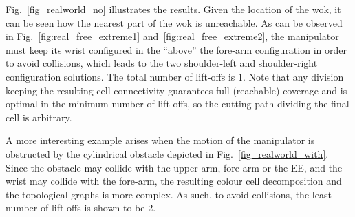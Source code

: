 \documentclass[journal]{IEEEtran}
\begin{document}
Fig.~\ref{fig_realworld_no} illustrates the results. Given the location of the wok, it can be seen how the nearest %
part of the wok is unreachable. 
As can be observed in Fig.~\ref{fig:real_free_extreme1} and~\ref{fig:real_free_extreme2}, 
the manipulator must keep its wrist configured in the ``above'' the fore-arm configuration in order to 
avoid collisions, which leads to the two shoulder-left and shoulder-right configuration solutions. 
The total number of lift-offs is $1$. 
Note that any division keeping the resulting cell connectivity guarantees full (reachable) coverage and is optimal in the minimum number of lift-offs, so the cutting path dividing the final cell is arbitrary. 

A more interesting example arises when the motion of the manipulator is obstructed by the cylindrical obstacle 
depicted in Fig.~\ref{fig_realworld_with}. Since the obstacle may collide with the upper-arm, fore-arm or the EE, 
and the wrist may collide with the fore-arm, %
the resulting colour cell decomposition and the topological graphs is more complex. As such, to avoid collisions, 
the least number of lift-offs is shown to be 2. 

\end{document}
